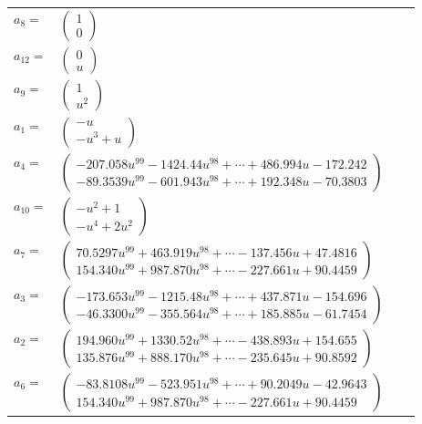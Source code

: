 \documentclass[1p]{elsarticle_modified}
\theoremstyle{definition}
\begin{document}
\begin{tabular}{m{7pt} m{180pt} m{7pt} m{180pt} }
\flushright $a_{8}=$&$\begin{pmatrix}1\\0\end{pmatrix}$ \\
\flushright $a_{12}=$&$\begin{pmatrix}0\\u\end{pmatrix}$ \\
\flushright $a_{9}=$&$\begin{pmatrix}1\\u^2\end{pmatrix}$ \\
\flushright $a_{1}=$&$\begin{pmatrix}- u\\- u^3+u\end{pmatrix}$ \\
\flushright $a_{4}=$&$\begin{pmatrix}-207.058 u^{99}-1424.44 u^{98}+\cdots+486.994 u-172.242\\-89.3539 u^{99}-601.943 u^{98}+\cdots+192.348 u-70.3803\end{pmatrix}$ \\
\flushright $a_{10}=$&$\begin{pmatrix}- u^2+1\\- u^4+2 u^2\end{pmatrix}$ \\
\flushright $a_{7}=$&$\begin{pmatrix}70.5297 u^{99}+463.919 u^{98}+\cdots-137.456 u+47.4816\\154.340 u^{99}+987.870 u^{98}+\cdots-227.661 u+90.4459\end{pmatrix}$ \\
\flushright $a_{3}=$&$\begin{pmatrix}-173.653 u^{99}-1215.48 u^{98}+\cdots+437.871 u-154.696\\-46.3300 u^{99}-355.564 u^{98}+\cdots+185.885 u-61.7454\end{pmatrix}$ \\
\flushright $a_{2}=$&$\begin{pmatrix}194.960 u^{99}+1330.52 u^{98}+\cdots-438.893 u+154.655\\135.876 u^{99}+888.170 u^{98}+\cdots-235.645 u+90.8592\end{pmatrix}$ \\
\flushright $a_{6}=$&$\begin{pmatrix}-83.8108 u^{99}-523.951 u^{98}+\cdots+90.2049 u-42.9643\\154.340 u^{99}+987.870 u^{98}+\cdots-227.661 u+90.4459\end{pmatrix}$ \\

\end{tabular}
\end{document}
